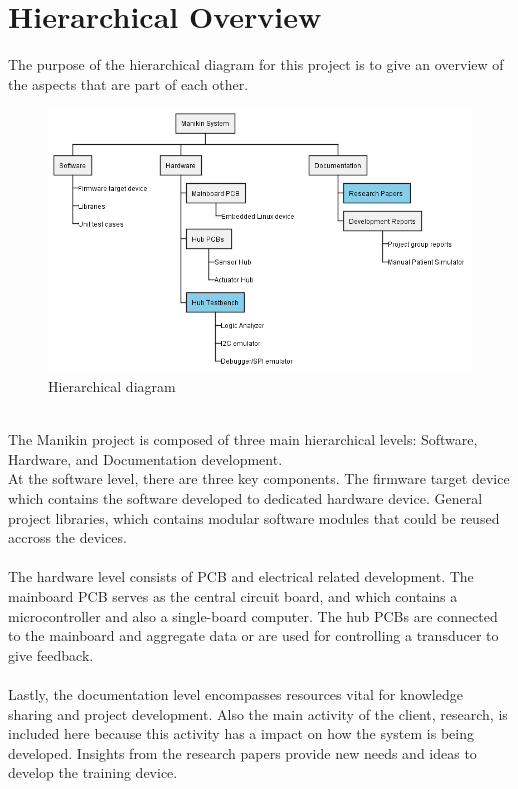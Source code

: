 \section{Hierarchical Overview}
The purpose of the hierarchical diagram for this project is to give an overview of the aspects that are part of each other. \\ 
\begin{figure}[h!]
  \includegraphics[scale=0.60]{figures/Hierarchial_Diagram.png}
  \caption{Hierarchical diagram}
\end{figure}\\
The Manikin project is composed of three main hierarchical levels: Software, Hardware, and Documentation development.\\
At the software level, there are three key components. The firmware target device which contains the software developed to dedicated hardware device. General project libraries, which contains modular software modules that could be reused accross the devices.\\\\
The hardware level consists of PCB and electrical related development. The mainboard PCB serves as the central circuit board, and which contains a microcontroller and also a single-board computer. The hub PCBs are connected to the mainboard and aggregate data or are used for controlling a transducer to give feedback. \\\\
Lastly, the documentation level encompasses resources vital for knowledge sharing and project development. Also the main activity of the client, research, is included here because this activity has a impact on how the system is being developed. Insights from the research papers provide new needs and ideas to develop the training device. \\ 
